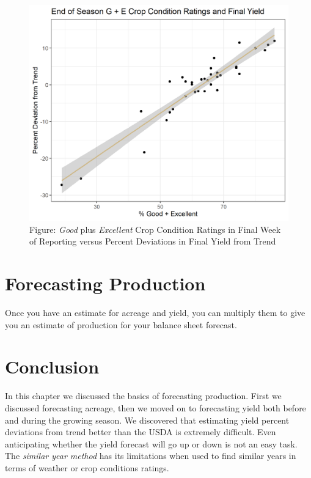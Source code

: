 \documentclass[
]{book}
\begin{document}
\begin{figure}
\centering
\includegraphics{assets/ForecastProduction-PercDeviationVSGEXY.png}
\caption{Figure: \emph{Good} plus \emph{Excellent} Crop Condition Ratings in Final Week of Reporting versus Percent Deviations in Final Yield from Trend}
\end{figure}

\hypertarget{forecasting-production-1}{%
\section{Forecasting Production}\label{forecasting-production-1}}

Once you have an estimate for acreage and yield, you can multiply them to give you an estimate of production for your balance sheet forecast.

\hypertarget{conclusion-1}{%
\section{Conclusion}\label{conclusion-1}}

In this chapter we discussed the basics of forecasting production. First we discussed forecasting acreage, then we moved on to forecasting yield both before and during the growing season. We discovered that estimating yield percent deviations from trend better than the USDA is extremely difficult. Even anticipating whether the yield forecast will go up or down is not an easy task. The \emph{similar year method} has its limitations when used to find similar years in terms of weather or crop conditions ratings.
\end{document}
